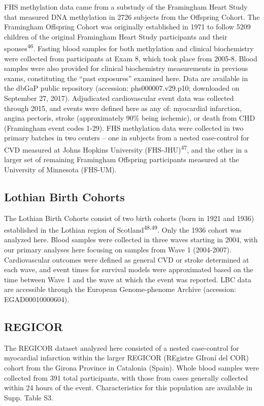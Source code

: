 \documentclass[]{article}
\begin{document}
FHS methylation data came from a substudy of the Framingham Heart Study
that measured DNA methylation in 2726 subjects from the Offspring
Cohort. The Framingham Offspring Cohort was originally established in
1971 to follow 5209 children of the original Framingham Heart Study
participants and their spouses\textsuperscript{46}. Fasting blood samples
for both methylation and clinical biochemistry were collected from
participants at Exam 8, which took place from 2005-8. Blood samples were
also provided for clinical biochemistry measurements in previous exams,
constituting the ``past exposures'' examined here. Data are available in
the dbGaP public repository (accession: phs000007.v29.p10; downloaded on
September 27, 2017). Adjudicated cardiovascular event data was collected
through 2015, and events were defined here as any of: myocardial
infarction, angina pectoris, stroke (approximately 90\% being ischemic),
or death from CHD (Framingham event codes 1-29). FHS methylation data
were collected in two primary batches in two centers -- one in subjects
from a nested case-control for CVD measured at Johns Hopkins University
(FHS-JHU)\textsuperscript{47}, and the other in a larger set of
remaining Framingham Offspring participants measured at the University
of Minnesota (FHS-UM).

\hypertarget{lothian-birth-cohorts}{%
\subsection{Lothian Birth Cohorts}\label{lothian-birth-cohorts}}

The Lothian Birth Cohorts consist of two birth cohorts (born in 1921 and
1936) established in the Lothian region of Scotland\textsuperscript{48,49}. Only the 1936 cohort was analyzed here. Blood samples
were collected in three waves starting in 2004, with our primary
analyses here focusing on samples from Wave 1 (2004-2007).
Cardiovascular outcomes were defined as general CVD or stroke determined
at each wave, and event times for survival models were approximated
based on the time between Wave 1 and the wave at which the event was
reported. LBC data are accessible through the European Genome-phenome
Archive (accession: EGAD00010000604).

\hypertarget{regicor}{%
\subsection{REGICOR}\label{regicor}}

The REGICOR dataset analyzed here consisted of a nested case-control for
myocardial infarction within the larger REGICOR (REgistre GIroní del
COR) cohort from the Girona Province in Catalonia (Spain). Whole blood
samples were collected from 391 total participants, with those from
cases generally collected within 24 hours of the event. Characteristics
for this population are available in Supp. Table S3.
\end{document}
